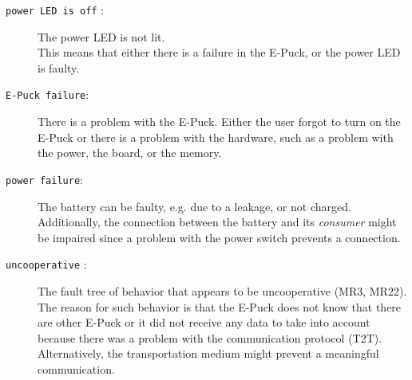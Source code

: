 \documentclass[a4paper,parskip,headheight=38pt]{scrartcl} %
\begin{document}
\begin{description}
\item[\texttt{power LED is off} :]
    The power LED is not lit. \\
    This means that either there is a failure in the E-Puck, or the power LED is faulty.
\item[\texttt{E-Puck failure}:]
    There is a problem with the E-Puck. 
    Either the user forgot to turn on the E-Puck or there is a problem with the hardware, such as a problem with the power, the board, or the memory.
\item[\texttt{power failure}:]
    The battery can be faulty, e.g. due to a leakage, or not charged. Additionally, the connection between the battery and its \textit{consumer} might be impaired since a problem with the power switch prevents a connection.
\item[\texttt{uncooperative} :]
    The fault tree of behavior that appears to be uncooperative (MR3, MR22). \\
    The reason for such behavior is that the E-Puck does not know that there are other E-Puck or it did not receive any data to take into account because there was a problem with the communication protocol (T2T). 
    Alternatively, the transportation medium might prevent a meaningful communication.


\end{description}
\end{document}
